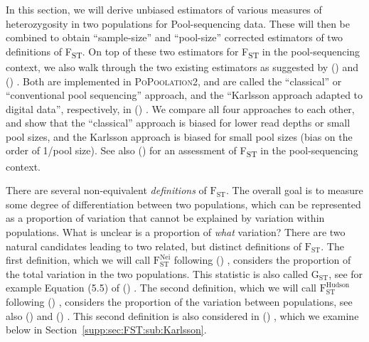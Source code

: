 \documentclass[letterpaper,fontsize=9pt,DIV=12]{scrartcl}
\newcommand\citeay[1]{\citeauthor{#1} (\citeyear{#1}) \cite{#1}}
\newcommand\toolname{\textsc}
\newcommand\secref[1]{Section~\ref{#1}}
\newcommand{\fst}{F\textsubscript{ST}}
\begin{document}
In this section, we will derive unbiased estimators of various measures of heterozygosity in two populations for Pool-sequencing data.
These will then be combined to obtain ``sample-size'' and ``pool-size'' corrected estimators of two definitions of \fst.
On top of these two estimators for \fst{} in the pool-sequencing context, we also walk through the two existing estimators as suggested by \citeay{Kofler2011b} and \citeay{Karlsson2007}.
Both are implemented in \toolname{PoPoolation2}, and are called the ``classical'' or ``conventional pool sequencing'' approach, and the ``Karlsson approach adapted to digital data'', respectively, in \citeay{Kofler2011b}.
We compare all four approaches to each other, and show that the ``classical'' approach is biased for lower read depths or small pool sizes, and the Karlsson approach is biased for small pool sizes (bias on the order of 1/pool size).
See also \citeay{Hivert2018} for an assessment of \fst{} in the pool-sequencing context.


\label{supp:sec:FST:sub:Definition}

There are several non-equivalent \emph{definitions} of $\text{F}_\text{ST}$.
The overall goal is to measure some degree of differentiation between two populations, which can be represented as a proportion of variation that cannot be explained by variation within populations.
What is unclear is a proportion of \emph{what} variation?
There are two natural candidates leading to two related, but distinct definitions of $\text{F}_\text{ST}$.
The first definition, which we will call $\text{F}_\text{ST}^\text{Nei}$ following \citeay{Nei1973}, considers the proportion of the total variation in the two populations.
This statistic is also called $\text{G}_\text{ST}$, see for example Equation (5.5) of \citeay{Hahn2018}.
The second definition, which we will call $\text{F}_\text{ST}^\text{Hudson}$ following \citeay{Hudson1992}, considers the proportion of the variation between populations, see also \citeay{Cockerham1969} and \citeay{Weir2002}.
This second definition is also considered in \citeay{Karlsson2007}, which we examine below in \secref{supp:sec:FST:sub:Karlsson}.
\end{document}
